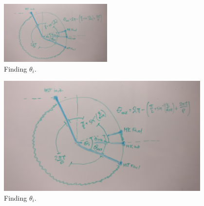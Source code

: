 \documentclass[12pt]{article}
\begin{document}
\begin{onehalfspacing}
\begin{figure}
    \includegraphics[width=0.5\textwidth, keepaspectratio]{prob2b-3}
  \caption[width=\textwidth, height=\textheight]{Finding $\theta_i$.}
\end{figure}
\fi
\begin{figure}
    \centering
    \begin{minipage}{0.48\textwidth}
        \centering
        \includegraphics[width=0.95\textwidth]{prob2b-3} %
        \caption{Finding $\theta_i$.}
    \end{minipage}
\end{figure}







\bigskip
\bigskip
\end{onehalfspacing}
\end{document}
